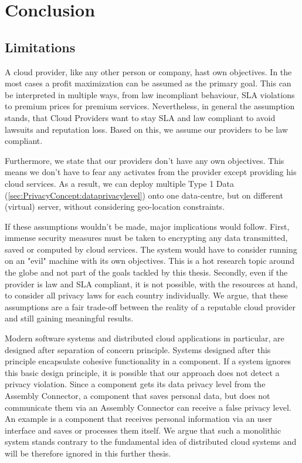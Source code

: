 
\chapter{Conclusion}
\label{ch:Conclusion}

\section{Limitations}
\label{sec:Conculsion:limits}

A cloud provider, like any other person or company, hast own objectives. In the most cases a profit maximization can be assumed as the primary goal. This can be interpreted in multiple ways, from law incompliant behaviour, SLA violations to premium prices for premium services. Nevertheless, in general the assumption stands, that Cloud Providers want to stay SLA and law compliant to avoid lawsuits and reputation loss. Based on this, we assume our providers to be law compliant. 

Furthermore, we state that our providers don’t have any own objectives. This means we don’t have to fear any activates from the provider except providing his cloud services. As a result, we can deploy multiple Type 1 Data (\autoref{sec:PrivacyConcept:dataprivacylevel}) onto one data-centre, but on different (virtual) server, without considering geo-location constraints.

If these assumptions wouldn’t be made, major implications would follow. First, immense security measures must be taken to encrypting any data transmitted, saved or computed by cloud services. The system would have to consider running on an "evil" machine with its own objectives. This is a hot research topic around the globe and not part of the goals tackled by this thesis. Secondly, even if the provider is law and SLA compliant, it is not possible, with the resources at hand, to consider all privacy laws for each country individually. We argue, that these assumptions are a fair trade-off between the reality of a reputable cloud provider and still gaining meaningful results.

Modern software systems and distributed cloud applications in particular, are designed after separation of concern principle. Systems designed after this principle encapsulate cohesive functionality in a component. If a system ignores this basic design principle, it is possible that our approach does not detect a privacy violation. Since a component gets its data privacy level from the Assembly Connector, a component that saves personal data, but does not communicate them via an Assembly Connector can receive a false privacy level. An example is a component that receives personal information via an user interface and saves or processes them itself. We argue that such a monolithic system stands contrary to the fundamental idea of distributed cloud systems and will be therefore ignored in this further thesis.